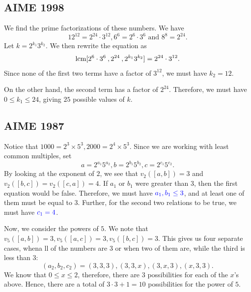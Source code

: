 
\subsection{AIME 1998}

We find the prime factorizations of these numbers. We have $$12^{12}=2^{24}\cdot 3^{12}, 6^6=2^6\cdot 3^6 \text{ and } 8^8=2^{24}.$$ Let $k=2^{k_1}3^{k_2}$.  We then rewrite the equation as $$\operatorname{lcm}[2^6\cdot 3^6\:, 2^{24}\:, 2^{k_1}3^{k_2}]=2^{24}\cdot 3^{12}.$$ Since none of the first two terms have a factor of $3^{12}$, we must have $k_2=12$. 

On the other hand, the second term has a factor of $2^{24}$. Therefore, we must have $0\le k_1\le 24$, giving $\boxed{25}$ possible values of $k$.  
\subsection{AIME 1987}

Notice that $1000=2^3\times 5^3, 2000=2^4\times 5^3$.  Since we are working with least common multiples, set $$a=2^{a_1}5^{a_2}, b=2^{b_1}5^{b_2}, c=2^{c_1}5^{c_2}.$$
By looking at the exponent of $2$, we see that $v_2([a,b])=3$ and $v_2([b,c])=v_2([c,a])=4$.
If $a_1$ or $b_1$ were greater than $3$, then the first equation would be false. Therefore, we must have $\color{blue} a_1, b_1\le 3$, and \color{ForestGreen} at least one of them must be equal to $3$. \color{black} Further, for the second two relations to be true, we must have $\color{blue} c_1=4$.  

Now, we consider the powers of $5$. We note that $v_5([a,b])=3, v_5([a,c])=3, v_5([b,c])=3$. This gives us four separate cases, whena ll of the numbers are $3$ or when two of them are, while the third is less than $3$: $$(a_2, b_2, c_2)=(3,3,3), (3,3,x), (3,x, 3), (x,3,3).$$ We know that $0\le x\le 2$, therefore, there are $3$ possibilities for each of the $x$'s above. Hence, there are a total of $3\cdot 3+1=10$ possibilities for the power of $5$.

